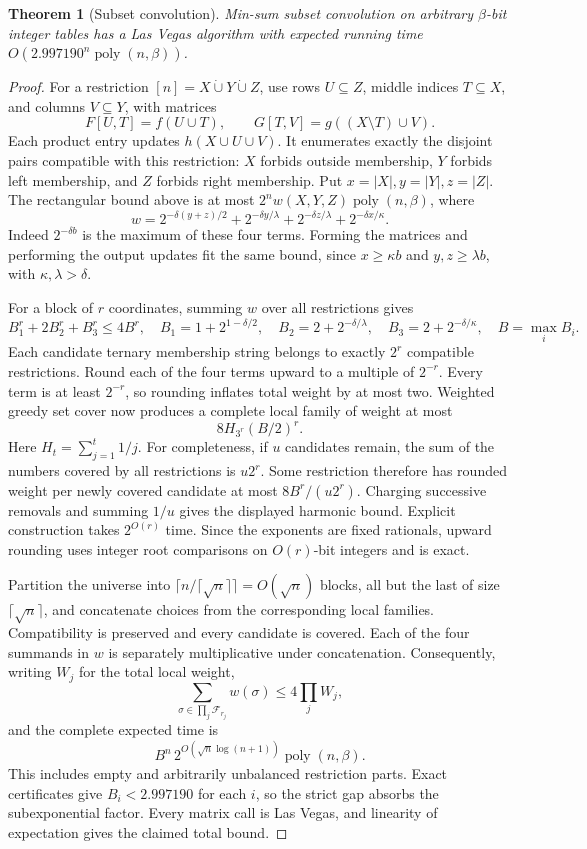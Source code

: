 \documentclass[11pt]{article}
\newtheorem{theorem}{Theorem}
\begin{document}
\begin{theorem}[Subset convolution]
\label{thm:subset-convolution}
Min-sum subset convolution on arbitrary $\beta$-bit integer tables has a
Las Vegas algorithm with expected running time
$O(2.997190^n\operatorname{poly}(n,\beta))$.
\end{theorem}
\begin{proof}
For a restriction $[n]=X\mathbin{\dot\cup}Y\mathbin{\dot\cup}Z$,
use rows $U\subseteq Z$, middle indices $T\subseteq X$, and columns
$V\subseteq Y$, with matrices
\[
F[U,T]=f(U\cup T),\qquad
G[T,V]=g((X\setminus T)\cup V).
\]
Each product entry updates $h(X\cup U\cup V)$. It enumerates exactly
the disjoint pairs compatible with this restriction: $X$ forbids outside
membership, $Y$ forbids left membership, and $Z$ forbids right membership.
Put $x=|X|,y=|Y|,z=|Z|$. The rectangular bound above is at most
$2^n w(X,Y,Z)\operatorname{poly}(n,\beta)$, where
\[
w=2^{-\delta(y+z)/2}+2^{-\delta y/\lambda}
  +2^{-\delta z/\lambda}+2^{-\delta x/\kappa}.
\]
Indeed $2^{-\delta b}$ is the maximum of these four terms. Forming
the matrices and performing the output updates fit the same bound,
since $x\ge\kappa b$ and $y,z\ge\lambda b$, with
$\kappa,\lambda>\delta$.

For a block of $r$ coordinates, summing $w$ over all restrictions gives
\[
B_1^r+2B_2^r+B_3^r\le4B^r,
\quad B_1=1+2^{1-\delta/2},\quad
B_2=2+2^{-\delta/\lambda},\quad B_3=2+2^{-\delta/\kappa},
\quad B=\max_iB_i.
\]
Each candidate ternary membership string belongs to exactly $2^r$
compatible restrictions. Round each of the four terms upward to a
multiple of $2^{-r}$. Every term is at least $2^{-r}$, so rounding
inflates total weight by at most two. Weighted greedy set cover now
produces a complete local family of weight at most
\[
8H_{3^r}(B/2)^r.
\]
Here $H_t=\sum_{j=1}^t1/j$.
For completeness, if $u$ candidates remain, the sum of the numbers
covered by all restrictions is $u2^r$. Some restriction therefore has
rounded weight per newly covered candidate at most
$8B^r/(u2^r)$. Charging successive removals and summing $1/u$ gives
the displayed harmonic bound. Explicit construction takes $2^{O(r)}$
time. Since the exponents are fixed rationals, upward rounding uses
integer root comparisons on $O(r)$-bit integers and is exact.

Partition the universe into $\lceil n/\lceil\sqrt n\rceil\rceil=O(\sqrt n)$
blocks, all but the last of size $\lceil\sqrt n\rceil$, and concatenate choices from the corresponding local families.
Compatibility is preserved and every candidate is covered. Each of the
four summands in $w$ is separately multiplicative under concatenation.
Consequently, writing $W_j$ for the total local weight,
\[
\sum_{\sigma\in\prod_j\mathcal F_{r_j}}w(\sigma)
 \le4\prod_jW_j,
\]
and the complete expected time is
\[
B^n\,2^{O(\sqrt n\log(n+1))}\operatorname{poly}(n,\beta).
\]
This includes empty and arbitrarily unbalanced restriction parts.
Exact certificates give $B_i<2.997190$ for each $i$, so the strict
gap absorbs the subexponential factor. Every matrix call is Las Vegas,
and linearity of expectation gives the claimed total bound.
\end{proof}
\end{document}
